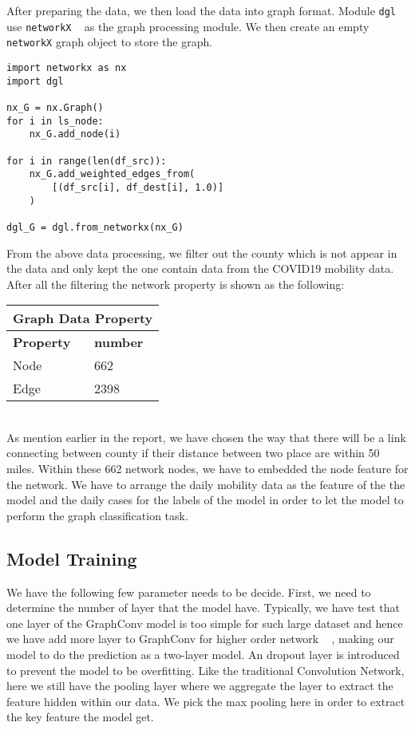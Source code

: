 After preparing the data, we then load the data into graph format. Module \texttt{dgl} ~\cite{wang2019dgl} use \texttt{networkX} ~\cite{SciPyProceedings_11} as the graph processing module. We then create an empty \texttt{networkX} graph object to store the graph. 

\begin{verbatim}
import networkx as nx
import dgl

nx_G = nx.Graph()
for i in ls_node:
    nx_G.add_node(i)
    
for i in range(len(df_src)):
    nx_G.add_weighted_edges_from(
        [(df_src[i], df_dest[i], 1.0)]
    )

dgl_G = dgl.from_networkx(nx_G)
\end{verbatim}

From the above data processing, we filter out the county which is not appear in the data and only kept the one contain data from the COVID19 mobility data. After all the filtering the network property is shown as the following:

\begin{tabular}{ |p{2cm}|p{2cm}| }
 \hline
 \multicolumn{2}{|c|}{Graph Data Property} \\
 \hline
 \textbf{Property}    & \textbf{number}  \\
 \hline
 Node & 662  \\
 \hline
 Edge & 2398  \\
 \hline
\end{tabular}\\

As mention earlier in the report, we have chosen the way that there will be a link connecting between county if their distance between two place are within 50 miles. Within these 662 network nodes, we have to embedded the node feature for the network. We have to arrange the daily mobility data as the feature of the the model and the daily cases for the labels of the model in order to let the model to perform the graph classification task.

\subsection{Model Training}

We have the following few parameter needs to be decide. First, we need to determine the number of layer that the model have. Typically, we have test that one layer of the GraphConv model is too simple for such large dataset and hence we have add  more layer to GraphConv for higher order network ~\cite{morris2021weisfeiler} , making our model to do the prediction as a two-layer model. An dropout layer is introduced to prevent the model to be overfitting. Like the traditional Convolution Network, here we still have the pooling layer where we aggregate the layer to extract the feature hidden within our data. We pick the max pooling here in order to extract the key feature the model get.\\


